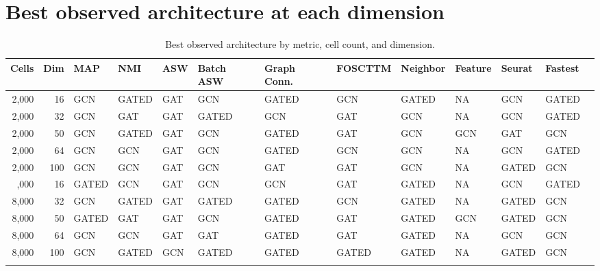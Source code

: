 \documentclass[10pt]{article}
\begin{document}
\section{Best observed architecture at each dimension}
\begin{landscape}\begin{table}[H]\centering\scriptsize
\caption{Best observed architecture by metric, cell count, and dimension.}
\begin{tabular}{@{}rrlllllllllll@{}}\toprule
Cells & Dim & MAP & NMI & ASW & Batch ASW & Graph Conn. & FOSCTTM & Neighbor & Feature & Seurat & Fastest \\\midrule
2,000 & 16 & GCN & GATED & GAT & GCN & GATED & GCN & GATED & NA & GCN & GATED \\
2,000 & 32 & GCN & GAT & GAT & GATED & GCN & GAT & GCN & NA & GCN & GATED \\
2,000 & 50 & GCN & GATED & GAT & GCN & GATED & GAT & GCN & GCN & GAT & GCN \\
2,000 & 64 & GCN & GCN & GAT & GCN & GATED & GCN & GCN & NA & GCN & GATED \\
2,000 & 100 & GCN & GCN & GAT & GCN & GAT & GAT & GCN & NA & GATED & GCN \\
\addlinespace
8,000 & 16 & GATED & GCN & GAT & GCN & GCN & GAT & GATED & NA & GCN & GATED \\
8,000 & 32 & GCN & GATED & GAT & GATED & GATED & GCN & GATED & NA & GATED & GCN \\
8,000 & 50 & GATED & GAT & GAT & GCN & GATED & GAT & GATED & GCN & GATED & GCN \\
8,000 & 64 & GCN & GCN & GAT & GAT & GATED & GAT & GATED & NA & GCN & GCN \\
8,000 & 100 & GCN & GATED & GCN & GATED & GATED & GATED & GATED & NA & GATED & GCN \\
\addlinespace
\bottomrule\end{tabular}\end{table}\end{landscape}
\end{document}
